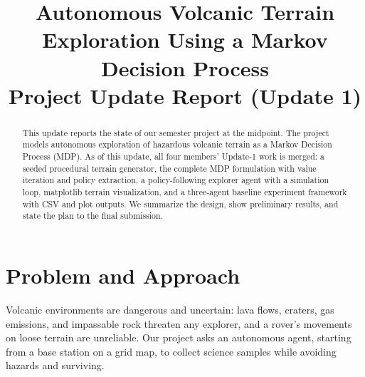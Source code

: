 \documentclass[conference]{IEEEtran}
\begin{document}
\title{Autonomous Volcanic Terrain Exploration Using a Markov Decision Process\\
{\Large Project Update Report (Update 1)}}
\author{
}
\maketitle
\begin{abstract}
This update reports the state of our semester project at the midpoint. The project models autonomous exploration of hazardous volcanic terrain as a Markov Decision Process (MDP). As of this update, all four members' Update-1 work is merged: a seeded procedural terrain generator, the complete MDP formulation with value iteration and policy extraction, a policy-following explorer agent with a simulation loop, matplotlib terrain visualization, and a three-agent baseline experiment framework with CSV and plot outputs. We summarize the design, show preliminary results, and state the plan to the final submission.
\end{abstract}
\section{Problem and Approach}

Volcanic environments are dangerous and uncertain: lava flows, craters, gas emissions, and impassable rock threaten any explorer, and a rover's movements on loose terrain are unreliable. Our project asks an autonomous agent, starting from a base station on a grid map, to collect science samples while avoiding hazards and surviving.
\end{document}
